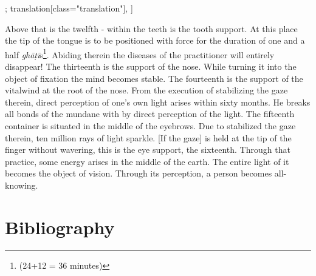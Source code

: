 \begin{alignment}[
  texts=edition[class="edition"];
  translation[class="translation"],
  ]
\begin{edition}
  \end{edition}
  \begin{translation}
    \begin{tlate}
      \noindent
      Above that is the twelfth - within the teeth is the tooth support. At this place the tip of the tongue is to be positioned with force for the duration of one and a half \textit{ghāṭī}s\footnote{(24+12 = 36 minutes)}. Abiding therein the diseases of the practitioner will entirely disappear!
The thirteenth is the support of the nose. While turning it into the object of fixation the mind becomes stable.\textsuperscript{\coro{[\lowroman{40}]}}
The fourteenth is the support of the vitalwind at the root of the nose. From the execution of stabilizing the gaze therein, direct perception of one's own light arises within sixty months. He breaks all bonds of the mundane with by direct perception of the light.
The fifteenth container is situated in the middle of the eyebrows. Due to stabilized the gaze therein, ten million rays of light sparkle.\textsuperscript{\coro{[\lowroman{45}]}}
[If the gaze] is held at the tip of the finger without wavering, this is the eye support, the sixteenth. Through that practice, some energy arises in the middle of the earth. The entire light of it becomes the object of vision. Through its perception, a person becomes all-knowing.\textsuperscript{\coro{[\lowroman{50}]}}
      \end{tlate}
  \end{translation}
\end{alignment}


\chapter{Bibliography}
 \label{sec:bibli}
   \clearpage
\newpage 
\thispagestyle{empty}
\quad  \addtocounter{page}{-1}

